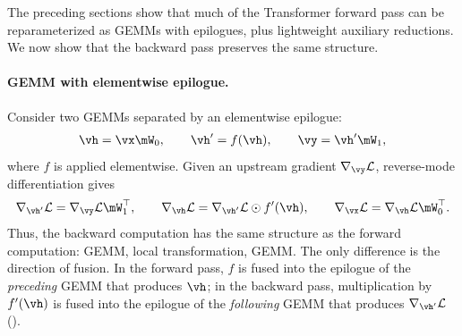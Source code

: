 The preceding sections show that much of the Transformer forward pass can be reparameterized as GEMMs with epilogues, plus lightweight auxiliary reductions. We now show that the backward pass preserves the same structure.

\paragraph{GEMM with elementwise epilogue.}
Consider two GEMMs separated by an elementwise epilogue:
\begin{align*}
    \vh = \vx \mW_0, \qquad
    \vh^\prime = f(\vh), \qquad
    \vy = \vh^\prime \mW_1 ,
\end{align*}
where $f$ is applied elementwise. Given an upstream gradient $\nabla_{\vy}\mathcal{L}$, reverse-mode differentiation gives
\begin{align*}
    \nabla_{\vh^\prime}\mathcal{L}
    = \nabla_{\vy}\mathcal{L} \mW_1^\top, \qquad
    \nabla_{\vh}\mathcal{L}
    = \nabla_{\vh^\prime}\mathcal{L} \odot f^\prime(\vh), \qquad
    \nabla_{\vx}\mathcal{L}
    = \nabla_{\vh}\mathcal{L} \mW_0^\top .
\end{align*}
Thus, the backward computation has the same structure as the forward computation: GEMM, local transformation, GEMM. The only difference is the direction of fusion. In the forward pass, $f$ is fused into the epilogue of the \textit{preceding} GEMM that produces $\vh$; in the backward pass, multiplication by $f^\prime(\vh)$ is fused into the epilogue of the \textit{following} GEMM that produces $\nabla_{\vh^\prime}\mathcal{L}$ ().

